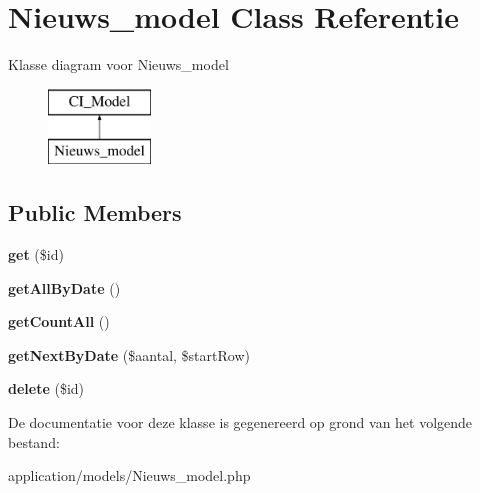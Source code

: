 \hypertarget{class_nieuws__model}{}\section{Nieuws\+\_\+model Class Referentie}
\label{class_nieuws__model}
Klasse diagram voor Nieuws\+\_\+model\begin{figure}[H]
\begin{center}
\leavevmode
\includegraphics[height=2.000000cm]{class_nieuws__model}
\end{center}
\end{figure}
\subsection*{Public Members}
\begin{DoxyCompactItemize}
\item 
\mbox{\label{class_nieuws__model_a50e3bfb586b2f42932a6a93f3fbb0828}} 
{\bfseries get} (\$id)
\item 
\mbox{\label{class_nieuws__model_a7044e1706254bc5711cc4c19d38f5627}} 
{\bfseries get\+All\+By\+Date} ()
\item 
\mbox{\label{class_nieuws__model_af006a519b21f2d312b9b394e48753e17}} 
{\bfseries get\+Count\+All} ()
\item 
\mbox{\label{class_nieuws__model_a55270d404a227e5dfdb1653f843972bd}} 
{\bfseries get\+Next\+By\+Date} (\$aantal, \$start\+Row)
\item 
\mbox{\label{class_nieuws__model_a2f8258add505482d7f00ea26493a5723}} 
{\bfseries delete} (\$id)
\end{DoxyCompactItemize}


De documentatie voor deze klasse is gegenereerd op grond van het volgende bestand\+:\begin{DoxyCompactItemize}
\item 
application/models/Nieuws\+\_\+model.\+php\end{DoxyCompactItemize}
